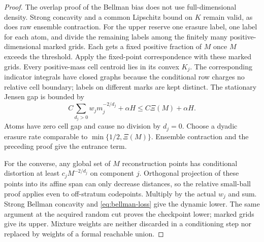 \begin{proof}
The overlap proof of the Bellman bias does not use full-dimensional density. Strong concavity and a common Lipschitz bound on $K$ remain valid, as does raw ensemble contraction. For the upper reserve one erasure label, one label for each atom, and divide the remaining labels among the finitely many positive-dimensional marked grids. Each gets a fixed positive fraction of $M$ once $M$ exceeds the threshold. Apply the fixed-point correspondence with these marked grids. Every positive-mass cell centroid lies in its convex $K_j$. The corresponding indicator integrals have closed graphs because the conditional row charges no relative cell boundary; labels on different marks are kept distinct. The stationary Jensen gap is bounded by
\[
 C\sum_{d_j>0}w_j m_j^{-2/d_j}+\alpha H\le C\Xi(M)+\alpha H.
\]
Atoms have zero cell gap and cause no division by $d_j=0$. Choose a dyadic erasure rate comparable to $\min\{1/2,\Xi(M)\}$. Ensemble contraction and the preceding proof give the entrance term.

For the converse, any global set of $M$ reconstruction points has conditional distortion at least $c_jM^{-2/d_j}$ on component $j$. Orthogonal projection of these points into its affine span can only decrease distances, so the relative small-ball proof applies even to off-stratum codepoints. Multiply by the actual $w_j$ and sum. Strong Bellman concavity and \eqref{eq:bellman-loss} give the dynamic lower. The same argument at the acquired random cut proves the checkpoint lower; marked grids give its upper. Mixture weights are neither discarded in a conditioning step nor replaced by weights of a formal reachable union.
\end{proof}

